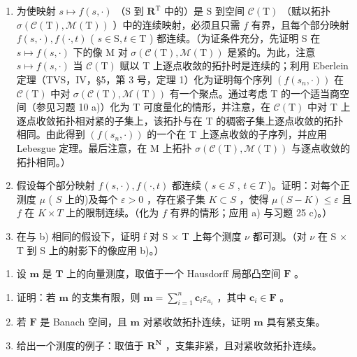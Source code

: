 \begin{enumerate}
\def\labelenumi{\alph{enumi})}
\item
  为使映射 \(s \mapsto f(s, \cdot)\) （S 到 \(\mathbf{R}^{\mathrm{T}}\) 中的）是 S 到空间 \(\mathcal{C}(\mathrm{T})\) （赋以拓扑 \(\sigma(\mathcal{C}(\mathrm{T}), \mathcal{M}(\mathrm{T}))\) ）中的连续映射，必须且只需 \(f\) 有界，且每个部分映射 \(f(s, \cdot), f(\cdot, t)\) ( \(s \in \mathrm{S}, t \in \mathrm{T}\) ) 都连续。（为证条件充分，先证明 S 在 \(s \mapsto f(s, \cdot)\) 下的像 M 对 \(\sigma(\mathcal{C}(\mathrm{T}), \mathcal{M}(\mathrm{T}))\) 是紧的。为此，注意 \(s \mapsto f(s, \cdot)\) 当 \(\mathcal{C}(\mathrm{T})\) 赋以 T 上逐点收敛的拓扑时是连续的；利用 Eberlein 定理（TVS，IV，§5，第 3 号，定理 1）化为证明每个序列 \((f(s_n, \cdot))\) 在 \(\mathcal{C}(\mathrm{T})\) 中对 \(\sigma(\mathcal{C}(\mathrm{T}), \mathcal{M}(\mathrm{T}))\) 有一个聚点。通过考虑 T 的一个适当商空间（参见习题 10 a)）化为 T 可度量化的情形，并注意，在 \(\mathcal{C}(\mathrm{T})\) 中对 T 上逐点收敛拓扑相对紧的子集上，该拓扑与在 T 的稠密子集上逐点收敛的拓扑相同。由此得到 \((f(s_n, \cdot))\) 的一个在 T 上逐点收敛的子序列，并应用 Lebesgue 定理。最后注意，在 M 上拓扑 \(\sigma(\mathcal{C}(\mathrm{T}), \mathcal{M}(\mathrm{T}))\) 与逐点收敛的拓扑相同。）
\item
  假设每个部分映射 \(f(s, \cdot), f(\cdot, t)\) 都连续 ( \(s \in S\) , \(t \in T\) )。证明：对每个正测度 \(\mu\) ( \(S\) 上的)及每个 \(\varepsilon > 0\) ，存在紧子集 \(K \subset S\) ，使得 \(\mu(S - K) \leqslant \varepsilon\) 且 \(f\) 在 \(K \times T\) 上的限制连续。（化为 \(f\) 有界的情形；应用 a) 与习题 25 c)。）
\item
  在与 b) 相同的假设下，证明 f 对 S × T 上每个测度 \(\nu\) 都可测。（对 \(\nu\) 在 S × T 到 S 上的射影下的像应用 b)。）
\end{enumerate}

\begin{enumerate}
\def\labelenumi{\arabic{enumi})}
\setcounter{enumi}{26}
\tightlist
\item
  设 \(\mathbf{m}\) 是 \(\mathbf{T}\) 上的向量测度，取值于一个 Hausdorff 局部凸空间 \(\mathbf{F}\) 。
\end{enumerate}

\begin{enumerate}
\def\labelenumi{\alph{enumi})}
\item
  证明：若 \(\mathbf{m}\) 的支集有限，则 \(\mathbf{m} = \sum_{i=1}^{n} \mathbf{c}_i \varepsilon_{a_i}\) ，其中 \(\mathbf{c}_i \in \mathbf{F}\) 。
\item
  若 \(\mathbf{F}\) 是 Banach 空间，且 \(\mathbf{m}\) 对紧收敛拓扑连续，证明 \(\mathbf{m}\) 具有紧支集。
\item
  给出一个测度的例子：取值于 \(\mathbf{R}^{\mathbf{N}}\) ，支集非紧，且对紧收敛拓扑连续。
\end{enumerate}

